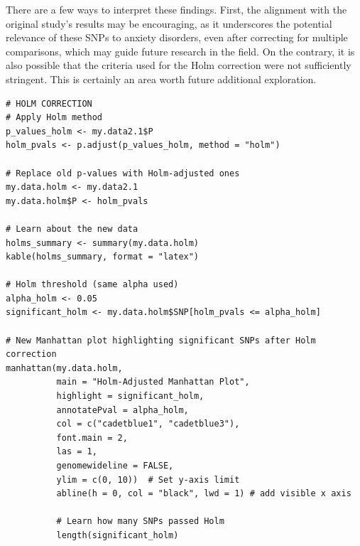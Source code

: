 \documentclass[12pt]{article}
\begin{document}
There are a few ways to interpret these findings. First, the alignment with the original study’s results may be encouraging, as it underscores the potential relevance of these SNPs to anxiety disorders, even after correcting for multiple comparisons, which may guide future research in the field. On the contrary, it is also possible that the criteria used for the Holm correction were not sufficiently stringent. This is certainly an area worth future additional exploration. \par

\begin{lstlisting}[style=Rstyle]
# HOLM CORRECTION
# Apply Holm method
p_values_holm <- my.data2.1$P
holm_pvals <- p.adjust(p_values_holm, method = "holm")

# Replace old p-values with Holm-adjusted ones
my.data.holm <- my.data2.1
my.data.holm$P <- holm_pvals

# Learn about the new data
holms_summary <- summary(my.data.holm)
kable(holms_summary, format = "latex")

# Holm threshold (same alpha used)
alpha_holm <- 0.05
significant_holm <- my.data.holm$SNP[holm_pvals <= alpha_holm]

# New Manhattan plot highlighting significant SNPs after Holm correction
manhattan(my.data.holm,
          main = "Holm-Adjusted Manhattan Plot",
          highlight = significant_holm,
          annotatePval = alpha_holm,
          col = c("cadetblue1", "cadetblue3"),
          font.main = 2,
          las = 1,
          genomewideline = FALSE,
          ylim = c(0, 10))  # Set y-axis limit
          abline(h = 0, col = "black", lwd = 1) # add visible x axis

          # Learn how many SNPs passed Holm
          length(significant_holm)
\end{lstlisting}
\clearpage

\end{document}
